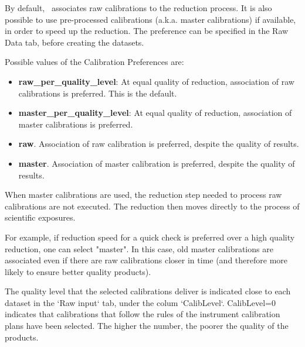 By default, \edps\ associates raw calibrations to the reduction
process. It is also possible to use pre-processed calibrations
(a.k.a. master calibrations) if available, in order to speed up the
reduction.  The preference can be specified in the Raw Data tab,
before creating the datasets.



Possible values of the Calibration Preferences are:

\begin{itemize}

 \item {\bf raw\_per\_quality\_level}: At equal quality of reduction,
   association of raw calibrations is preferred. This is the default.

\item {\bf master\_per\_quality\_level}: At equal quality of
  reduction, association of master calibrations is preferred.

\item {\bf raw}. Association of raw calibration is preferred, despite
  the quality of results.
  
\item {\bf master}. Association of master calibration is preferred,
  despite the quality of results.
\end{itemize}

When master calibrations are used, the reduction step needed to
process raw calibrations are not executed. The reduction then moves
directly to the process of scientific exposures.

For example, if reduction speed for a quick check is preferred over a
high quality reduction, one can select "master".  In this case, old
master calibrations are associated even if there are raw calibrations
closer in time (and therefore more likely to ensure better quality
products).

The quality level that the selected calibrations deliver is indicated
close to each dataset in the `Raw input` tab, under the colum
`CalibLevel`. CalibLevel=0 indicates that calibrations that follow the
rules of the instrument calibration plans have been selected. The
higher the number, the poorer the quality of the products.

